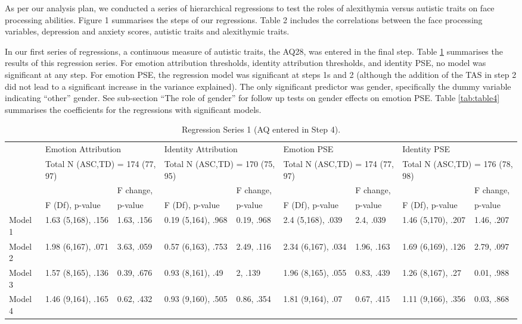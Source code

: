 \documentclass[
]{article}
\begin{document}
As per our analysis plan, we conducted a series of hierarchical regressions to test the roles of alexithymia versus autistic traits on face processing abilities. Figure 1 summarises the steps of our regressions. Table 2 includes the correlations between the face processing variables, depression and anxiety scores, autistic traits and alexithymic traits.

In our first series of regressions, a continuous measure of autistic traits, the AQ28, was entered in the final step. Table \ref{tab:table3} summarises the results of this regression series. For emotion attribution thresholds, identity attribution thresholds, and identity PSE, no model was significant at any step. For emotion PSE, the regression model was significant at steps 1s and 2 (although the addition of the TAS in step 2 did not lead to a significant increase in the variance explained). The only significant predictor was gender, specifically the dummy variable indicating ``other'' gender. See sub-section ``The role of gender'' for follow up tests on gender effects on emotion PSE. Table \ref{tab:table4} summarises the coefficients for the regressions with significant models.

\begin{table}[H]

\caption{\label{tab:table3}Regression Series 1 (AQ entered in Step 4).}
\centering
\fontsize{5}{7}\selectfont
\begin{tabular}[t]{lllllllll}
\toprule
\multicolumn{1}{l}{} & \multicolumn{2}{l}{Emotion Attribution} & \multicolumn{2}{l}{Identity Attribution} & \multicolumn{2}{l}{Emotion PSE} & \multicolumn{2}{l}{Identity PSE} \\
\multicolumn{1}{l}{} & \multicolumn{2}{l}{Total N (ASC,TD) = 174 (77, 97)} & \multicolumn{2}{l}{Total N (ASC,TD) = 170 (75, 95)} & \multicolumn{2}{l}{Total N (ASC,TD) = 174 (77, 97)} & \multicolumn{2}{l}{Total N (ASC,TD) = 176 (78, 98)} \\
\cmidrule(l{3pt}r{3pt}){2-3} \cmidrule(l{3pt}r{3pt}){4-5} \cmidrule(l{3pt}r{3pt}){6-7} \cmidrule(l{3pt}r{3pt}){8-9}
 &  & F change, &  & F change, &  & F change, &  & F change,\\
 & F (Df), p-value & p-value & F (Df), p-value & p-value & F (Df), p-value & p-value & F (Df), p-value & p-value\\
\midrule
Model 1 & 1.63 (5,168), .156 & 1.63, .156 & 0.19 (5,164), .968 & 0.19, .968 & 2.4 (5,168), .039 & 2.4, .039 & 1.46 (5,170), .207 & 1.46, .207\\
Model 2 & 1.98 (6,167), .071 & 3.63, .059 & 0.57 (6,163), .753 & 2.49, .116 & 2.34 (6,167), .034 & 1.96, .163 & 1.69 (6,169), .126 & 2.79, .097\\
Model 3 & 1.57 (8,165), .136 & 0.39, .676 & 0.93 (8,161), .49 & 2, .139 & 1.96 (8,165), .055 & 0.83, .439 & 1.26 (8,167), .27 & 0.01, .988\\
\addlinespace
Model 4 & 1.46 (9,164), .165 & 0.62, .432 & 0.93 (9,160), .505 & 0.86, .354 & 1.81 (9,164), .07 & 0.67, .415 & 1.11 (9,166), .356 & 0.03, .868\\
\bottomrule
\end{tabular}
\end{table}
\end{document}
